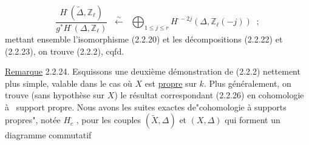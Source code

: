 \begin{equation}\tag{2.2.23}
\frac{H^{\cdot}(\widetilde{\Delta},\mathbb{Z}_{\ell})}{g^{*}H^{\cdot}(\Delta,\mathbb{Z}_{\ell})} \;\;\stackrel{\sim}{\longleftarrow}\;\; \bigoplus_{1\leq j\leq r} H^{\cdot-2j}(\Delta,\mathbb{Z}_{\ell}(-j)) \;\;;
\end{equation}
mettant ensemble l'isomorphisme (2.2.20) et les décompositions (2.2.22) et (2.2.23), on trouve (2.2.2), cqfd.

\underline{Remarque} 2.2.24. \quad Esquissons une deuxième démonstration de (2.2.2) nettement plus simple, valable dans le cas où $X$ est \underline{propre} sur $k$. Plus généralement, on trouve (sans hypothèse sur $X$) le résultat correspondant (2.2.26) en cohomologie à \ support propre. Nous avons les suites exactes de"cohomologie à supports propres", notée $H^{\cdot}_{c}$ , pour les couples $(\widetilde{X},\Delta)$ et $(X,\Delta)$ qui forment un diagramme commutatif 



